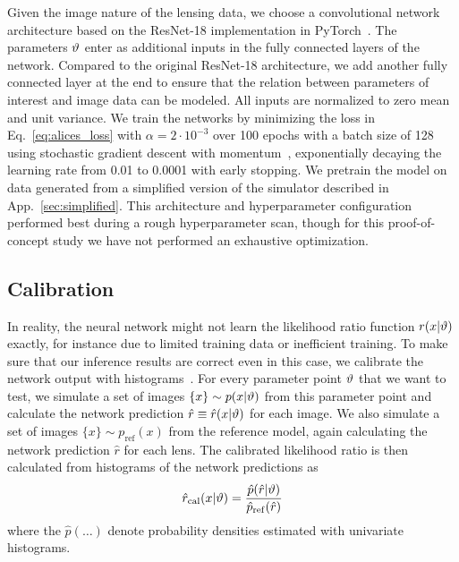 \documentclass[twocolumn]{aastex62}
\begin{document}
Given the image nature of the lensing data, we choose a convolutional network architecture based on the ResNet-18 \citep{he2016deep} implementation in PyTorch~\citep{paszke2017automatic}. The parameters $\vartheta$ enter as additional inputs in the fully connected layers of the network. Compared to the original ResNet-18 architecture, we add another fully connected layer at the end to ensure that the relation between parameters of interest and image data can be modeled. All inputs are normalized to zero mean and unit variance. We train the networks by minimizing the loss in Eq.~\eqref{eq:alices_loss} with $\alpha = 2 \cdot 10^{-3}$ over 100 epochs with a batch size of 128 using stochastic gradient descent with momentum~\citep{Qian:1999:MTG:307343.307376}, exponentially decaying the learning rate from 0.01 to 0.0001 with early stopping. We pretrain the model on data generated from a simplified version of the simulator described in App.~\ref{sec:simplified}. This architecture and hyperparameter configuration performed best during a rough hyperparameter scan, though for this proof-of-concept study we have not performed an exhaustive optimization.


\subsection{Calibration}
\label{sec:lfi-calibration}

In reality, the neural network might not learn the likelihood ratio function $r(x|\vartheta)$ exactly, for instance due to limited training data or inefficient training. To make sure that our inference results are correct even in this case, we calibrate the network output with histograms~\citep{Cranmer:2015bka, 1805.00020}. For every parameter point $\vartheta$ that we want to test, we simulate a set of images $\{x\} \sim p(x|\vartheta)$ from this parameter point and calculate the network prediction $\hat{r} \equiv \hat{r}(x|\vartheta)$ for each image. We also simulate a set of images $\{x\} \sim p_{\mathrm{ref}}(x)$ from the reference model, again calculating the network prediction $\hat{r}$ for each lens. The calibrated likelihood ratio is then calculated from histograms of the network predictions as
%
\begin{equation}
  \hat{r}_\mathrm{cal}(x|\stattheta)
  = \frac {\hat{p}( \hat{r} | \stattheta )} {\hat{p}_\mathrm{ref}(\hat{r})}
\end{equation}
%
where the $\hat{p}(\dots)$ denote probability densities estimated with univariate histograms.
\end{document}
